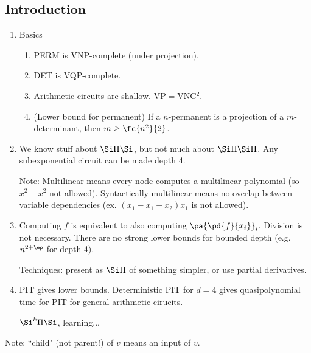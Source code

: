 \subsection{Introduction}
\begin{enumerate}
\item
Basics
\begin{enumerate}
\item
PERM is VNP-complete (under projection).
\item DET is VQP-complete. 
\item 
Arithmetic circuits are shallow. VP$=$VNC${}^2$.
\item (Lower bound for permanent) If a $n$-permanent is a projection of a $m$-determinant, then $m\ge \fc{n^2}{2}$.
\end{enumerate}
\item
We know stuff about $\Si\Pi\Si$, but not much about $\Si\Pi\Si\Pi$. Any subexponential circuit can be made depth 4.

Note: %
Multilinear means every node computes a multilinear polynomial (so $x^2-x^2$ not allowed). Syntactically multilinear means no overlap between variable dependencies (ex. $(x_1-x_1+x_2)x_1$ is not allowed).
\item Computing $f$ is equivalent to also computing $\pa{\pd{f}{x_i}}_i$. Division is not necessary. 
There are no strong lower bounds for bounded depth (e.g. $n^{2+\ep}$ for depth 4).

Techniques: present as $\Si\Pi$ of something simpler, or use partial derivatives.
\item
PIT gives lower bounds. Deterministic PIT for $d=4$ gives quasipolynomial time for PIT for general arithmetic cirucits. 

$\Si^k\Pi\Si$, learning...
\end{enumerate}

Note: ``child" (not parent!) of $v$ means an input of $v$.
